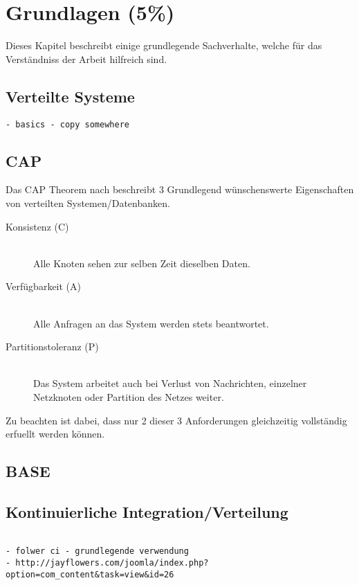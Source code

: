 \chapter{Grundlagen (5\%)}
\label{chap:base}
Dieses Kapitel beschreibt einige grundlegende Sachverhalte,
welche f\"ur das Verst\"andniss der Arbeit hilfreich sind.

\section{Verteilte Systeme}
\label{sec:base:vs}

\begin{verbatim}
- basics - copy somewhere
\end{verbatim}

\section{CAP}
\label{sec:base:cap}


% 
Das CAP Theorem nach \cite{brewer:cap} beschreibt 3 Grundlegend
w\"unschenswerte Eigenschaften von verteilten Systemen/Datenbanken.

\begin{description}
  \item[Konsistenz (C)] \hfill \\
      Alle Knoten sehen zur selben Zeit dieselben Daten. 
  \item[Verf\"ugbarkeit (A)] \hfill \\
      Alle Anfragen an das System werden stets beantwortet.
  \item[Partitionstoleranz (P)] \hfill \\
      Das System arbeitet auch bei Verlust von Nachrichten,
      einzelner Netzknoten oder Partition des Netzes weiter.
\end{description}

Zu beachten ist dabei, dass nur 2 dieser 3 Anforderungen gleichzeitig
vollst\"andig erfuellt werden k\"onnen.




\section{BASE}
\label{sec:base:base}

\section{Kontinuierliche Integration/Verteilung}
\label{sec:base:ci}
\begin{verbatim}

- folwer ci - grundlegende verwendung
- http://jayflowers.com/joomla/index.php?option=com_content&task=view&id=26
\end{verbatim}

